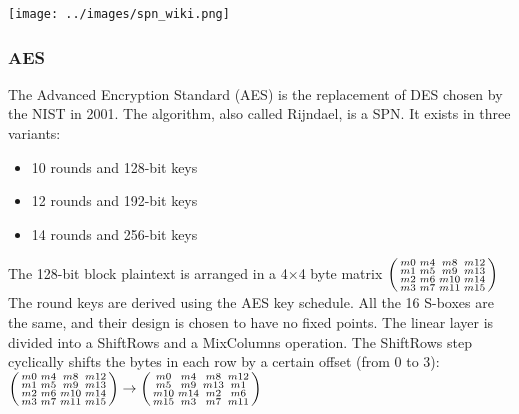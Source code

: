 \documentclass[11pt]{sdm}
\begin{document}
\begin{center}
    \texttt{[image: ../images/spn\_wiki.png]}
    \captionsetup{hypcap=false}
    \label{fig_spn}
\end{center}

\subsubsection{AES}

The Advanced Encryption Standard (AES) is the replacement of DES chosen by the NIST in 2001.
The algorithm, also called Rijndael, is a SPN. It exists in three variants:
\begin{itemize}
    \item 10 rounds and 128-bit keys
    \item 12 rounds and 192-bit keys
    \item 14 rounds and 256-bit keys
\end{itemize}

The 128-bit block plaintext is arranged in a 4$\times$4 byte matrix
$\begin{psmallmatrix}
    m0 & m4 & m8 & m12 \\
    m1 & m5 & m9 & m13 \\
    m2 & m6 & m10 & m14 \\
    m3 & m7 & m11 & m15
\end{psmallmatrix}$
The round keys are derived using the AES key schedule.
All the 16 S-boxes are the same, and their design is chosen to have no fixed points.
The linear layer is divided into a ShiftRows and a MixColumns operation.
The ShiftRows step cyclically shifts the bytes in each row by a certain offset (from 0 to 3):
$\begin{psmallmatrix}
    m0 & m4 & m8 & m12 \\
    m1 & m5 & m9 & m13 \\
    m2 & m6 & m10 & m14 \\
    m3 & m7 & m11 & m15
\end{psmallmatrix}
\rightarrow
\begin{psmallmatrix}
    m0 & m4 & m8 & m12 \\
    m5 & m9 & m13 & m1 \\
    m10 & m14 & m2 & m6 \\
    m15 & m3 & m7 & m11 \\
\end{psmallmatrix}$
\end{document}
